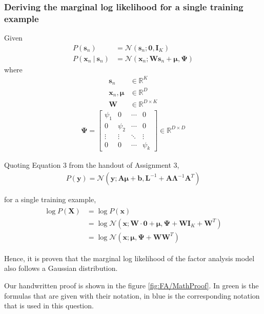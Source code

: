 \documentclass[a4paper,12pt]{article}
\newcommand{\given}{\ | \ }
\newcommand{\x}{\mathbf{x}}
\newcommand{\X}{\mathbf{X}}
\begin{document}
\subsubsection{Deriving the marginal log likelihood for a single training example}
Given 
\begin{align}
P(\mathbf{s}_n) &= \mathcal{N}(\mathbf{s}_n; \mathbf{0}, \mathbf{I}_K) \\
P(\x_n \given \mathbf{s}_n) & = \mathcal{N}(\x_n; \mathbf{W} \mathbf{s}_n + \bm{\mu}, \mathbf{\Psi})
\end{align}
where
\begin{align}
\mathbf{s}_n & \in \mathbb{R}^K \\
\mathbf{x}_n, \bm{\mu} & \in \mathbb{R}^D \\
\mathbf{W} & \in \mathbb{R}^{D \times K}
\end{align}
\vspace{-3em}
\begin{align}
\mathbf{\Psi} = \begin{bmatrix}
\psi_1 & 0 & \cdots & 0 \\
0 & \psi_2 & \cdots & 0 \\
\vdots & \vdots & \ddots & \vdots \\
0 & 0 & \cdots & \psi_k
\end{bmatrix} \in \mathbb{R}^{D \times D}
\end{align}

Quoting Equation 3 from the handout of Assignment 3,
\begin{align}
P(\mathbf{y}) = \mathcal{N}(\mathbf{y}; \mathbf{A} \bm{\mu} + \mathbf{b}, \mathbf{L}^{-1} + \mathbf{A} \mathbf{\Lambda}^{-1} \mathbf{A}^T)
\end{align}

for a single training example,
\begin{align}
\begin{split}
\log P(\X) & = \log P(\x) \\
& = \log \mathcal{N}(\x; \mathbf{W} \cdot \mathbf{0} + \bm{\mu}, \mathbf{\Psi} + \mathbf{W} \mathbf{I}_K + \mathbf{W}^T) \\ 
& = \log \mathcal{N}(\x; \bm{\mu}, \mathbf{\Psi} + \mathbf{WW}^T)
\end{split}
\end{align} 

Hence, it is proven that the marginal log likelihood of the factor analysis model also follows a Gaussian distribution.

Our handwritten proof is shown in the figure \ref{fig:FA/MathProof}. In green is the formulas that are given with their notation, in blue is the corresponding notation that is used in this question. 
\end{document}
